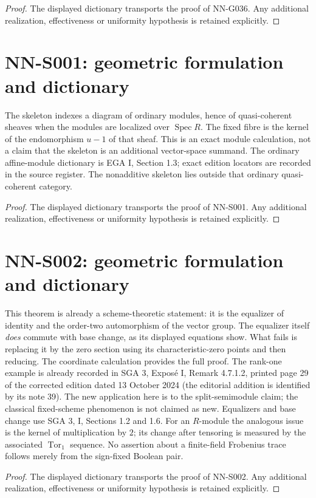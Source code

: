 \begin{proof} The displayed dictionary transports the proof of NN-G036. Any additional realization, effectiveness or uniformity hypothesis is retained explicitly.\end{proof}


\section{NN-S001: geometric formulation and dictionary}
\begin{geometricstatement}[NN-S001]
The skeleton indexes a diagram of ordinary modules, hence of
quasi-coherent sheaves when the modules are localized over $\operatorname{Spec}R$.
The fixed fibre is the kernel of the endomorphism $u-1$ of that sheaf.
This is an exact module calculation, not a claim that the skeleton is
an additional vector-space summand. The ordinary affine-module
dictionary is EGA I, Section 1.3; exact edition locators are recorded
in the source register. The nonadditive skeleton lies outside that
ordinary quasi-coherent category.
\end{geometricstatement}
\begin{proof} The displayed dictionary transports the proof of NN-S001. Any additional realization, effectiveness or uniformity hypothesis is retained explicitly.\end{proof}


\section{NN-S002: geometric formulation and dictionary}
\begin{geometricstatement}[NN-S002]
This theorem is already a scheme-theoretic statement: it is the
equalizer of identity and the order-two automorphism of the vector
group. The equalizer itself \emph{does} commute with base change,
as its displayed equations show. What fails is replacing it by the
zero section using its characteristic-zero points and then reducing.
The coordinate calculation provides the full proof. The rank-one
example is already recorded in SGA 3, Expos\'e I, Remark 4.7.1.2,
printed page 29 of the corrected edition dated 13 October 2024
(the editorial addition is identified by its note 39). The new
application here is to the split-semimodule claim; the classical
fixed-scheme phenomenon is not claimed as new. Equalizers and base
change use SGA 3, I, Sections 1.2 and 1.6.
For an $R$-module the analogous issue is the kernel of multiplication
by $2$; its change after tensoring is measured by the associated
$\operatorname{Tor}_1$ sequence. No assertion about a finite-field
Frobenius trace follows merely from the sign-fixed Boolean pair.
\end{geometricstatement}
\begin{proof} The displayed dictionary transports the proof of NN-S002. Any additional realization, effectiveness or uniformity hypothesis is retained explicitly.\end{proof}


